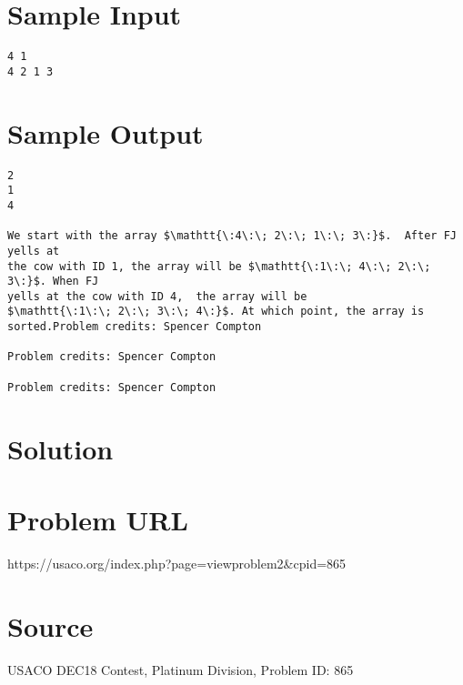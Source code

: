 \documentclass[12pt]{article}
\begin{document}
\section*{Sample Input}
\begin{verbatim}
4 1
4 2 1 3
\end{verbatim}

\section*{Sample Output}
\begin{verbatim}
2
1
4

We start with the array $\mathtt{\:4\:\; 2\:\; 1\:\; 3\:}$.  After FJ yells at
the cow with ID 1, the array will be $\mathtt{\:1\:\; 4\:\; 2\:\; 3\:}$. When FJ
yells at the cow with ID 4,  the array will be
$\mathtt{\:1\:\; 2\:\; 3\:\; 4\:}$. At which point, the array is sorted.Problem credits: Spencer Compton

Problem credits: Spencer Compton

Problem credits: Spencer Compton
\end{verbatim}

\section*{Solution}


\section*{Problem URL}
https://usaco.org/index.php?page=viewproblem2&cpid=865

\section*{Source}
USACO DEC18 Contest, Platinum Division, Problem ID: 865
\end{document}
